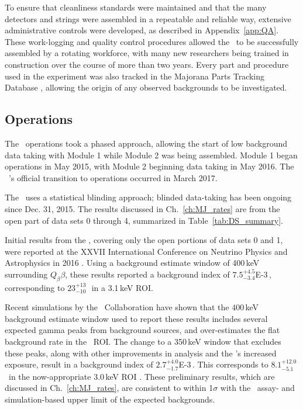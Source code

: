 To ensure that cleanliness standards were maintained and that the many detectors and strings were assembled in a repeatable and reliable way, extensive administrative controls were developed, as described in Appendix~\ref{app:QA}. These work-logging and quality control procedures allowed the \DEM\ to be successfully assembled by a rotating workforce, with many new researchers being trained in construction over the course of more than two years. Every part and procedure used in the experiment was also tracked in the Majorana Parts Tracking Database \cite{MJD_PTDB}, allowing the origin of any observed backgrounds to be investigated. 

\subsection{Operations}
The \DEM\ operations took a phased approach, allowing the start of low background data taking with Module 1 while Module 2 was being assembled. Module 1 began operations in May 2015, with Module 2 beginning data taking in May 2016. The \MJ\ \DEM's official transition to operations occurred in March 2017. 

The \DEM\ uses a statistical blinding approach; blinded data-taking has been ongoing since Dec. 31, 2015. The results discussed in Ch.~\ref{ch:MJ_rates} are from the open part of data sets 0 through 4, summarized in Table~\ref{tab:DS_summary}. 

Initial results from the \DEM, covering only the open portions of data sets 0 and 1, were reported at the XXVII International Conference on Neutrino Physics and Astrophysics in 2016 \cite{MJD_Nu16}. Using a background estimate window of 400\,keV surrounding $Q_\beta\beta$, these results reported a background index of $7.5^{+4.5}_{-3.4}$E-3\,\cpKkgy, corresponding to $23^{+13}_{-10}$\,\cpRty\ in a 3.1\,keV ROI.

Recent simulations by the \MJ\ Collaboration have shown that the 400\,keV background estimate window used to report these results includes several expected gamma peaks from background sources, and over-estimates the flat background rate in the \nonubb\ ROI. The change to a 350\,keV window that excludes these peaks, along with other improvements in analysis and the \DEM's increased exposure, result in a background index of $2.7^{+4.0}_{-1.7}$E-3\,\cpKkgy. This corresponds to $8.1^{+12.0}_{-5.1}$\,\cpRty\ in the now-appropriate 3.0\,keV ROI \cite{EnergyUnidoc}. These preliminary results, which are discussed in Ch.~\ref{ch:MJ_rates}, are consistent to within 1$\sigma$ with the \DEM\ assay- and simulation-based upper limit of the expected backgrounds. 
